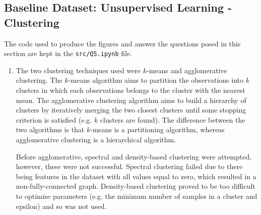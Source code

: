\documentclass{article}
\begin{document}
\subsection{Baseline Dataset: Unsupervised Learning - Clustering}
The code used to produce the figures and answer the questions posed in this section are kept in the \verb|src/Q5.ipynb| file.
\begin{enumerate}[label=\alph*)]
    \item The two clustering techniques used were $k$-means and agglomerative clustering. The $k$-means algorithm aims to partition the observations into $k$ clusters in which each observations belongs to the cluster with the nearest mean. The agglomerative clustering algorithm aims to build a hierarchy of clusters by iteratively merging the two closest clusters until some stopping criterion is satisfied (e.g. $k$ clusters are found). The difference between the two algorithms is that $k$-means is a partitioning algorithm, whereas agglomerative clustering is a hierarchical algorithm.
    
    Before agglomerative, spectral and density-based clustering were attempted, however, these were not successful. Spectral clustering failed due to there being features in the dataset with all values equal to zero, which resulted in a non-fully-connected graph. Density-based clustering proved to be too difficult to optimise parameters (e.g. the minimum number of samples in a cluster and epsilon) and so was not used.


\end{enumerate}
\end{document}
